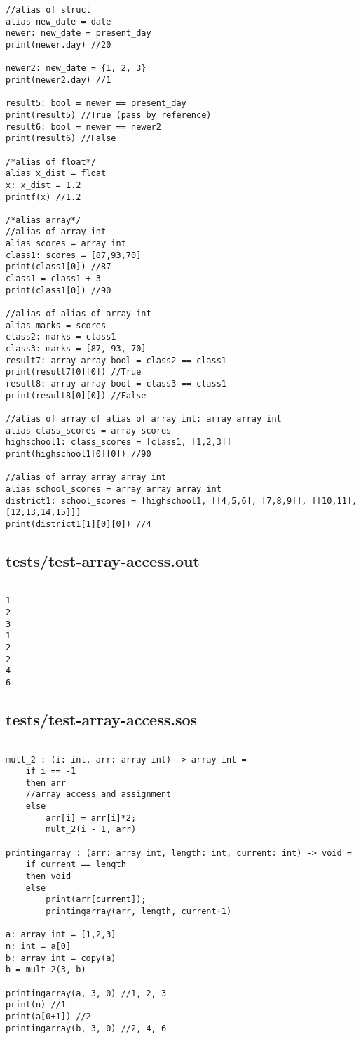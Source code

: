 \documentclass[main.tex]{subfiles}
\begin{document}
\begin{lstlisting}
//alias of struct
alias new_date = date
newer: new_date = present_day
print(newer.day) //20

newer2: new_date = {1, 2, 3}
print(newer2.day) //1

result5: bool = newer == present_day
print(result5) //True (pass by reference)
result6: bool = newer == newer2 
print(result6) //False

/*alias of float*/
alias x_dist = float
x: x_dist = 1.2
printf(x) //1.2

/*alias array*/
//alias of array int
alias scores = array int
class1: scores = [87,93,70]
print(class1[0]) //87
class1 = class1 + 3
print(class1[0]) //90

//alias of alias of array int
alias marks = scores
class2: marks = class1
class3: marks = [87, 93, 70]
result7: array array bool = class2 == class1
print(result7[0][0]) //True
result8: array array bool = class3 == class1
print(result8[0][0]) //False

//alias of array of alias of array int: array array int
alias class_scores = array scores
highschool1: class_scores = [class1, [1,2,3]]
print(highschool1[0][0]) //90

//alias of array array array int
alias school_scores = array array array int
district1: school_scores = [highschool1, [[4,5,6], [7,8,9]], [[10,11], [12,13,14,15]]]
print(district1[1][0][0]) //4
\end{lstlisting}

\subsection{tests/test-array-access.out}

\begin{lstlisting}

1
2
3
1
2
2
4
6
\end{lstlisting}

\subsection{tests/test-array-access.sos}

\begin{lstlisting}

mult_2 : (i: int, arr: array int) -> array int = 
    if i == -1
    then arr
    //array access and assignment
    else 
        arr[i] = arr[i]*2; 
        mult_2(i - 1, arr)

printingarray : (arr: array int, length: int, current: int) -> void =
    if current == length
    then void
    else 
        print(arr[current]);
        printingarray(arr, length, current+1)

a: array int = [1,2,3]
n: int = a[0]
b: array int = copy(a)
b = mult_2(3, b)

printingarray(a, 3, 0) //1, 2, 3
print(n) //1
print(a[0+1]) //2
printingarray(b, 3, 0) //2, 4, 6
\end{lstlisting}
\end{document}
